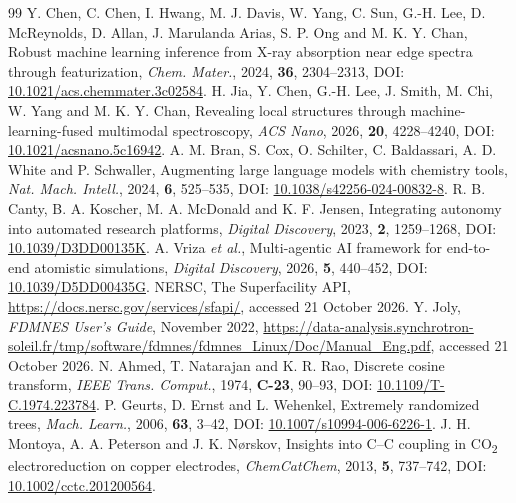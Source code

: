 \begin{thebibliography}{99}
 Y. Chen, C. Chen, I. Hwang, M. J. Davis, W. Yang, C. Sun, G.-H. Lee, D. McReynolds, D. Allan, J. Marulanda Arias, S. P. Ong and M. K. Y. Chan, Robust machine learning inference from X-ray absorption near edge spectra through featurization, \textit{Chem. Mater.}, 2024, \textbf{36}, 2304--2313, DOI: \href{https://doi.org/10.1021/acs.chemmater.3c02584}{10.1021/acs.chemmater.3c02584}.
 H. Jia, Y. Chen, G.-H. Lee, J. Smith, M. Chi, W. Yang and M. K. Y. Chan, Revealing local structures through machine-learning-fused multimodal spectroscopy, \textit{ACS Nano}, 2026, \textbf{20}, 4228--4240, DOI: \href{https://doi.org/10.1021/acsnano.5c16942}{10.1021/acsnano.5c16942}.
 A. M. Bran, S. Cox, O. Schilter, C. Baldassari, A. D. White and P. Schwaller, Augmenting large language models with chemistry tools, \textit{Nat. Mach. Intell.}, 2024, \textbf{6}, 525--535, DOI: \href{https://doi.org/10.1038/s42256-024-00832-8}{10.1038/s42256-024-00832-8}.
 R. B. Canty, B. A. Koscher, M. A. McDonald and K. F. Jensen, Integrating autonomy into automated research platforms, \textit{Digital Discovery}, 2023, \textbf{2}, 1259--1268, DOI: \href{https://doi.org/10.1039/D3DD00135K}{10.1039/D3DD00135K}.
 A. Vriza \textit{et al.}, Multi-agentic AI framework for end-to-end atomistic simulations, \textit{Digital Discovery}, 2026, \textbf{5}, 440--452, DOI: \href{https://doi.org/10.1039/D5DD00435G}{10.1039/D5DD00435G}.
 NERSC, The Superfacility API, \url{https://docs.nersc.gov/services/sfapi/}, accessed 21 October 2026.
 Y. Joly, \textit{FDMNES User's Guide}, November 2022, \url{https://data-analysis.synchrotron-soleil.fr/tmp/software/fdmnes/fdmnes_Linux/Doc/Manual_Eng.pdf}, accessed 21 October 2026.
 N. Ahmed, T. Natarajan and K. R. Rao, Discrete cosine transform, \textit{IEEE Trans. Comput.}, 1974, \textbf{C-23}, 90--93, DOI: \href{https://doi.org/10.1109/T-C.1974.223784}{10.1109/T-C.1974.223784}.
 P. Geurts, D. Ernst and L. Wehenkel, Extremely randomized trees, \textit{Mach. Learn.}, 2006, \textbf{63}, 3--42, DOI: \href{https://doi.org/10.1007/s10994-006-6226-1}{10.1007/s10994-006-6226-1}.
 J. H. Montoya, A. A. Peterson and J. K. N\o rskov, Insights into C--C coupling in CO\textsubscript{2} electroreduction on copper electrodes, \textit{ChemCatChem}, 2013, \textbf{5}, 737--742, DOI: \href{https://doi.org/10.1002/cctc.201200564}{10.1002/cctc.201200564}.
\end{thebibliography}
